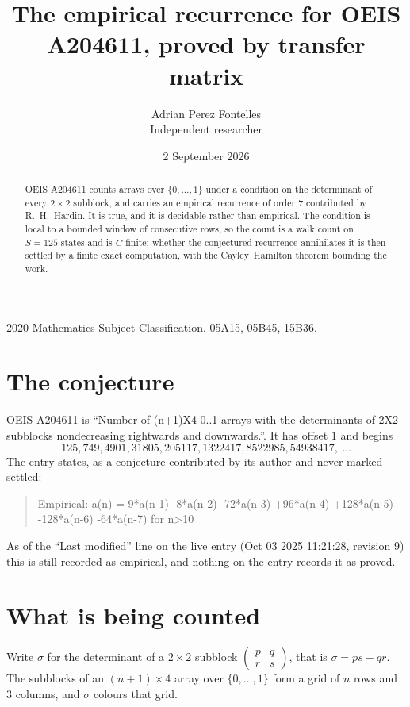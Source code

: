 \documentclass[11pt,a4paper]{article}
\title{The empirical recurrence for OEIS A204611, proved by transfer matrix}
\author{Adrian Perez Fontelles\\ \small Independent researcher}
\date{2 September 2026}
\theoremstyle{plain}
\theoremstyle{definition}
\begin{document}
\maketitle

\begin{abstract}
OEIS A204611 counts arrays over $\{0,\dots,1\}$ under a condition on the determinant of every
$2\times2$ subblock, and carries an empirical recurrence of order $7$ contributed by
R.~H.~Hardin. It is true, and it is decidable rather than empirical. The condition is local to
a bounded window of consecutive rows, so the count is a walk count on $S=125$ states and is
$C$-finite; whether the conjectured recurrence annihilates it is then settled by a finite exact
computation, with the Cayley--Hamilton theorem bounding the work.
\end{abstract}

\noindent\small 2020 Mathematics Subject Classification. 05A15, 05B45, 15B36.\normalsize

\section{The conjecture}

OEIS A204611 is ``Number of (n+1)X4 0..1 arrays with the determinants of 2X2 subblocks nondecreasing rightwards and downwards.''. It has offset $1$ and begins
\[
125, 749, 4901, 31805, 205117, 1322417, 8522985, 54938417,\ \dots
\]
The entry states, as a conjecture contributed by its author and never marked settled:
\begin{quote}
Empirical: a(n) = 9*a(n-1) -8*a(n-2) -72*a(n-3) +96*a(n-4) +128*a(n-5) -128*a(n-6) -64*a(n-7) for n>10
\end{quote}
As of the ``Last modified'' line on the live entry (Oct 03 2025 11:21:28, revision 9) this is still
recorded as empirical, and nothing on the entry records it as proved.

\section{What is being counted}

Write $\sigma$ for the determinant of a $2\times2$ subblock
$\begin{pmatrix}p&q\\r&s\end{pmatrix}$, that is $\sigma=ps-qr$. The subblocks of an
$(n+1)\times4$ array over $\{0,\dots,1\}$ form a grid of $n$ rows and $3$
columns, and $\sigma$ colours that grid.
\end{document}
